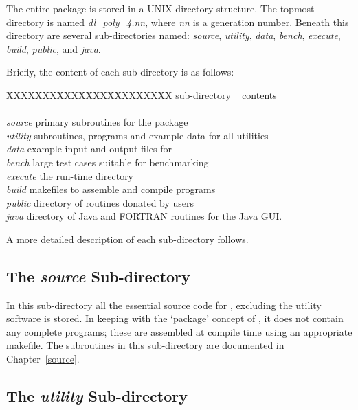 The entire \D package is stored in a UNIX directory structure. The
topmost directory is named {\em dl\_poly\_4.nn}, where {\em nn} is
a generation number.  Beneath this directory are several
sub-directories named: {\em source},
{\em utility},
{\em data},
{\em bench},
{\em execute},
{\em build},
{\em public}, and
{\em java}.

Briefly, the content of each sub-directory is as follows:
\begin{tabbing}
XXXXXXXXXXXXXXX\= XXXXXXXX\= \kill
sub-directory\> ~ \> contents \\
\> ~ \> \\
{\em source} \> primary subroutines for the \D package \\
{\em utility} \> subroutines, programs and example data for all utilities \\
{\em data} \> example input and output files for \D \\
{\em bench} \> large test cases suitable for benchmarking \\
{\em execute} \> the \D run-time directory \\
{\em build} \> makefiles to assemble and compile \D programs \\
{\em public} \> directory of routines donated by \D users \\
{\em java} \> directory of Java and FORTRAN routines for the Java GUI. \\
\end{tabbing}

\noindent A more detailed description of each sub-directory
follows.

\subsection{The {\em source} Sub-directory}

In this sub-directory all the essential source code for \D,
excluding the utility software is stored.  In keeping with the
`package' concept of \D, it does not contain any complete
programs; these are assembled at compile time using an appropriate
makefile.  The subroutines in this sub-directory are documented in
Chapter~\ref{source}.

\subsection{The {\em utility} Sub-directory}

